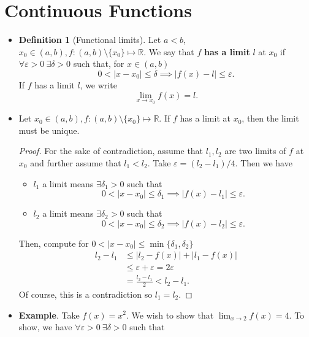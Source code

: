 \documentclass{article}
\newcommand{\R}{\mathbb{R}}
\newcommand{\?}{\stackrel{?}{=}}
\newcommand{\smallblacksquare}{\rule{0.5em}{0.5em}}
\theoremstyle{definition} %
\newtheorem{definition}[subsection]{Definition} %
\begin{document}
\section{Continuous Functions}

\begin{itemize}
    \item[]
    \begin{definition}[Functional limits]
        Let $a < b$, $x_0 \in (a, b), f:(a, b) \setminus \{x_0\} \mapsto \R$. We say that $f$ \textbf{has a limit} $l$ at $x_0$ if $\forall \varepsilon > 0 \ \exists \delta > 0$ such that, for $x \in (a, b)$
        $$0 < |x - x_0| \leq \delta \implies |f(x) - l| \leq \varepsilon.$$
        If $f$ has a limit $l$, we write
        $$\lim_{x \to x_0} f(x) = l.$$
    \end{definition}
    \item[]
    \begin{proposition}
        Let $x_0 \in (a, b), f: (a, b) \setminus \{x_0\} \mapsto \R$. If $f$ has a limit at $x_0$, then the limit must be unique.    
    \end{proposition}
    \begin{proof}
        For the sake of contradiction, assume that $l_1, l_2$ are two limits of $f$ at $x_0$ and further assume that $l_1 < l_2$. Take $\varepsilon = (l_2 - l_1) / 4$. Then we have
        \begin{itemize}[label=\smallblacksquare]
            \item $l_1$ a limit means $\exists \delta_1 > 0$ such that
            $$0 < |x - x_0| \leq \delta_1 \implies |f(x) - l_1| \leq \varepsilon.$$
            \item $l_2$ a limit means $\exists \delta_2 > 0$ such that
            $$0 < |x - x_0| \leq \delta_2 \implies |f(x) - l_2| \leq \varepsilon.$$
        \end{itemize}
        Then, compute for $0 < |x - x_0| \leq \min\{\delta_1, \delta_2\}$
        \begin{align*}
            l_2 - l_1 &\leq |l_2 - f(x)| + |l_1 - f(x)| \\ 
            &\leq \varepsilon + \varepsilon = 2\varepsilon \\
            &= \frac{l_2 - l_1}{2} < l_2 - l_1.
        \end{align*}
        Of course, this is a contradiction so $l_1 = l_2$.
    \end{proof}
    \item \textbf{Example}. Take $f(x) = x^2$. We wish to show that $\lim_{x \to 2} f(x) = 4$. To show, we have $\forall \varepsilon > 0 \ \exists \delta > 0$ such that 

\end{itemize}
\end{document}

